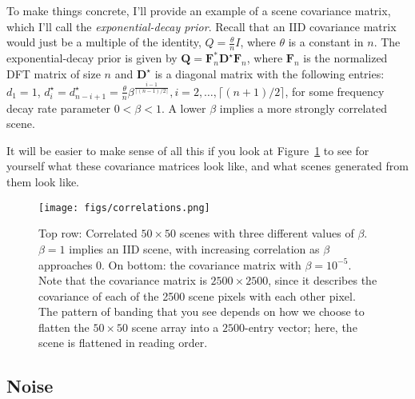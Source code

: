 To make things concrete, I'll provide an example of a scene covariance matrix, which I'll call the \emph{exponential-decay prior}. Recall that an IID covariance matrix would just be a multiple of the identity, $Q = \frac{\theta}{n} I$, where $\theta$ is a constant in $n$. The exponential-decay prior is given by $\mathbf{Q} = \mathbf{F}^*_n\mathbf{D}^\star\mathbf{F}_n$, where $\mathbf{F}_n$ is the normalized DFT matrix of size $n$ and $\mathbf{D}^\star$ is a diagonal matrix with the following entries: $d_1=1$, $d_i^\star = d_{n-i+1}^\star = \frac{\theta}{n}\beta^{\frac{i-1}{\lceil(n-1)/2\rceil}}, i=2,\ldots,\lceil(n+1)/2\rceil$, for some frequency decay rate parameter $0 < \beta < 1$. A lower $\beta$ implies a more strongly correlated scene.


It will be easier to make sense of all this if you look at Figure~\ref{fig:correlations} to see for yourself what these covariance matrices look like, and what scenes generated from them look like.

\begin{figure}
\begin{center}
\texttt{[image: figs/correlations.png]}
\caption{Top row: Correlated $50 \times 50$ scenes with three different values of $\beta$. $\beta=1$ implies an IID scene, with increasing correlation as $\beta$ approaches 0. On bottom: the covariance matrix with $\beta=10^{-5}$. Note that the  covariance matrix is $2500 \times 2500$, since it describes the covariance of each of the 2500 scene pixels with each other pixel. The pattern of banding that you see depends on how we choose to flatten the $50 \times 50$ scene array into a $2500$-entry vector; here, the scene is flattened in reading order. \label{fig:correlations}}
\end{center}
\end{figure}

\subsection{Noise}


